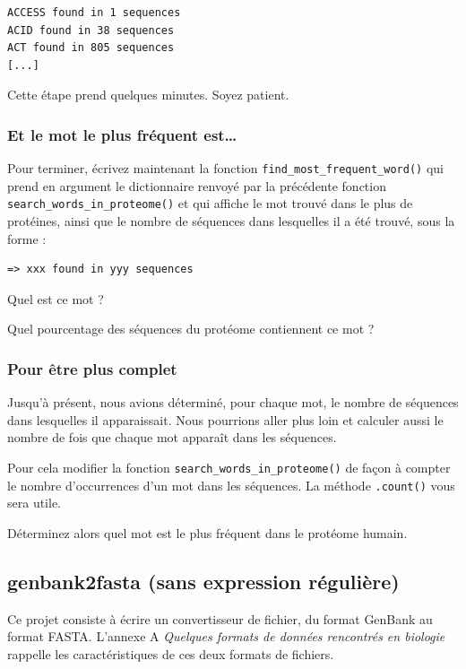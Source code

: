 \documentclass[a4paper,11pt,twoside]{book}
\begin{document}
\begin{verbatim}
ACCESS found in 1 sequences
ACID found in 38 sequences
ACT found in 805 sequences
[...]
\end{verbatim}

Cette étape prend quelques minutes. Soyez patient.

\subsubsection{Et le mot le plus fréquent
est\ldots{}}\label{et-le-mot-le-plus-fruxe9quent-est}

Pour terminer, écrivez maintenant la fonction
\texttt{find\_most\_frequent\_word()} qui prend en argument le
dictionnaire renvoyé par la précédente fonction
\texttt{search\_words\_in\_proteome()} et qui affiche le mot trouvé dans
le plus de protéines, ainsi que le nombre de séquences dans lesquelles
il a été trouvé, sous la forme :

\begin{verbatim}
=> xxx found in yyy sequences
\end{verbatim}

Quel est ce mot ?

Quel pourcentage des séquences du protéome contiennent ce mot ?

\subsubsection{Pour être plus complet}\label{pour-uxeatre-plus-complet}

Jusqu'à présent, nous avions déterminé, pour chaque mot, le nombre de
séquences dans lesquelles il apparaissait. Nous pourrions aller plus
loin et calculer aussi le nombre de fois que chaque mot apparaît dans
les séquences.

Pour cela modifier la fonction \texttt{search\_words\_in\_proteome()} de
façon à compter le nombre d'occurrences d'un mot dans les séquences. La
méthode \texttt{.count()} vous sera utile.

Déterminez alors quel mot est le plus fréquent dans le protéome humain.

\subsection{genbank2fasta (sans expression
régulière)}\label{genbank2fasta-sans-expression-ruxe9guliuxe8re}

Ce projet consiste à écrire un convertisseur de fichier, du format
GenBank au format FASTA. L'annexe A \emph{Quelques formats de données
rencontrés en biologie} rappelle les caractéristiques de ces deux
formats de fichiers.
\end{document}
